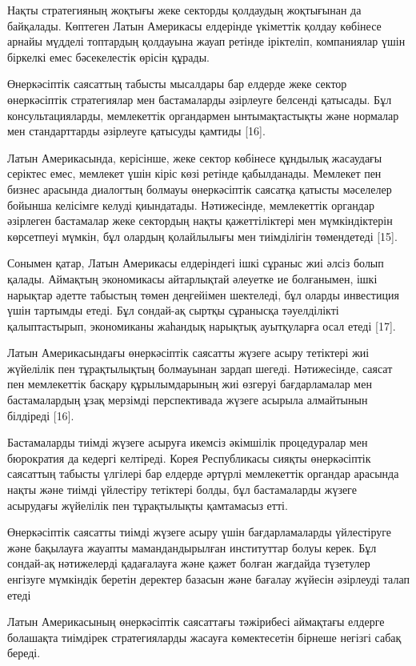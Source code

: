 \begin{multicols}{2}
Нақты стратегияның жоқтығы жеке секторды қолдаудың жоқтығынан да
байқалады. Көптеген Латын Америкасы елдерінде үкіметтік қолдау көбінесе
арнайы мүдделі топтардың қолдауына жауап ретінде іріктеліп, компаниялар
үшін біркелкі емес бәсекелестік өрісін құрады.

Өнеркәсіптік саясаттың табысты мысалдары бар елдерде жеке сектор
өнеркәсіптік стратегиялар мен бастамаларды әзірлеуге белсенді қатысады.
Бұл консультацияларды, мемлекеттік органдармен ынтымақтастықты және
нормалар мен стандарттарды әзірлеуге қатысуды қамтиды {[}16{]}.

Латын Америкасында, керісінше, жеке сектор көбінесе құндылық жасаудағы
серіктес емес, мемлекет үшін кіріс көзі ретінде қабылданады. Мемлекет
пен бизнес арасында диалогтың болмауы өнеркәсіптік саясатқа қатысты
мәселелер бойынша келісімге келуді қиындатады. Нәтижесінде, мемлекеттік
органдар әзірлеген бастамалар жеке сектордың нақты қажеттіліктері мен
мүмкіндіктерін көрсетпеуі мүмкін, бұл олардың қолайлылығы мен
тиімділігін төмендетеді {[}15{]}.

Сонымен қатар, Латын Америкасы елдеріндегі ішкі сұраныс жиі әлсіз болып
қалады. Аймақтың экономикасы айтарлықтай әлеуетке ие болғанымен, ішкі
нарықтар әдетте табыстың төмен деңгейімен шектеледі, бұл оларды
инвестиция үшін тартымды етеді. Бұл сондай-ақ сыртқы сұранысқа
тәуелділікті қалыптастырып, экономиканы жаһандық нарықтық ауытқуларға
осал етеді {[}17{]}.

Латын Америкасындағы өнеркәсіптік саясатты жүзеге асыру тетіктері жиі
жүйелілік пен тұрақтылықтың болмауынан зардап шегеді. Нәтижесінде,
саясат пен мемлекеттік басқару құрылымдарының жиі өзгеруі бағдарламалар
мен бастамалардың ұзақ мерзімді перспективада жүзеге асырыла алмайтынын
білдіреді {[}16{]}.

Бастамаларды тиімді жүзеге асыруға икемсіз әкімшілік процедуралар мен
бюрократия да кедергі келтіреді. Корея Республикасы сияқты өнеркәсіптік
саясаттың табысты үлгілері бар елдерде әртүрлі мемлекеттік органдар
арасында нақты және тиімді үйлестіру тетіктері болды, бұл бастамаларды
жүзеге асырудағы жүйелілік пен тұрақтылықты қамтамасыз етті.

Өнеркәсіптік саясатты тиімді жүзеге асыру үшін бағдарламаларды
үйлестіруге және бақылауға жауапты мамандандырылған институттар болуы
керек. Бұл сондай-ақ нәтижелерді қадағалауға және қажет болған жағдайда
түзетулер енгізуге мүмкіндік беретін деректер базасын және бағалау
жүйесін әзірлеуді талап етеді

Латын Америкасының өнеркәсіптік саясаттағы тәжірибесі аймақтағы елдерге
болашақта тиімдірек стратегияларды жасауға көмектесетін бірнеше негізгі
сабақ береді.


\end{multicols}
